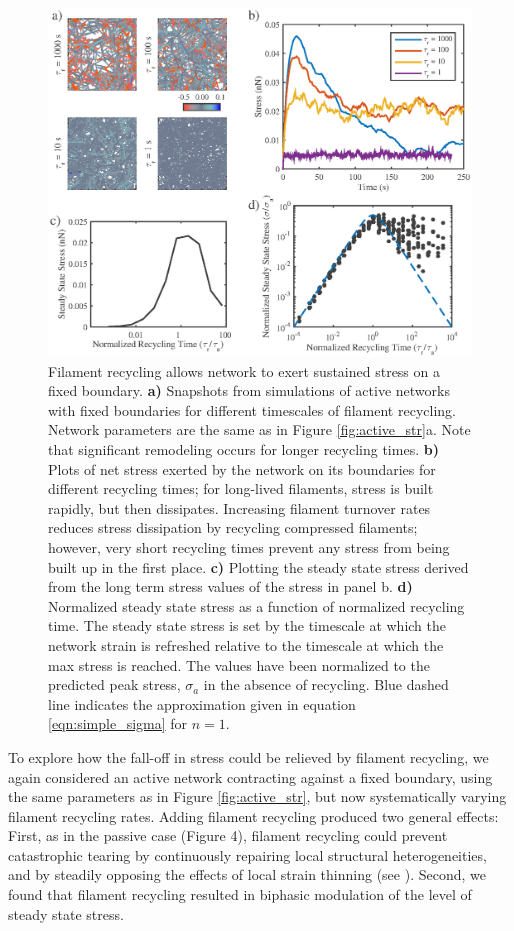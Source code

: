 \documentclass[10pt,letterpaper]{article}
\begin{document}
\begin{figure}[h!]
	\centering
	\includegraphics[width=\hsize]{figures/figure5b}
	\caption{\label{fig:active_rec} Filament recycling allows network to exert sustained stress on a fixed boundary. \textbf{a)} Snapshots from simulations of active networks with fixed boundaries for different timescales of filament recycling.  Network parameters are the same as in Figure \ref{fig:active_str}a. Note that significant remodeling occurs for longer recycling times. \textbf{b)} Plots of net stress exerted by the network on its boundaries for different recycling times; for long-lived filaments, stress is built rapidly, but then dissipates. Increasing filament turnover rates reduces stress dissipation by recycling compressed filaments; however, very short recycling times prevent any stress from being built up in the first place. \textbf{c)} Plotting the steady state stress derived from the long term stress values of the stress in panel b.  \textbf{d)} Normalized steady state stress as a function of normalized recycling time. The steady state stress is set by the timescale at which the network strain is refreshed relative to the timescale at which the max stress is reached. The values have been normalized to the predicted peak stress, $\sigma_a$ in the absence of recycling. Blue dashed line indicates the approximation given in equation \ref{eqn:simple_sigma} for $n=1$.}
\end{figure}

To explore how the fall-off in stress could be relieved by filament recycling, we again considered an active network contracting against a fixed boundary, using the same parameters as in Figure \ref{fig:active_str}, but now systematically varying filament recycling rates. Adding filament recycling produced two general effects: First, as in the passive case (Figure 4), filament recycling could prevent catastrophic tearing by continuously repairing local structural heterogeneities, and by steadily opposing the effects of local strain thinning (see ). Second, we found that filament recycling resulted in biphasic modulation of the level of steady state stress.
\end{document}

